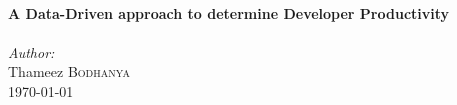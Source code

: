 \documentclass[12pt]{article}
\begin{document}
\begin{titlepage}
    \HRule \\[0.4cm]
    { \huge \bfseries A Data-Driven approach to determine Developer Productivity}\\[0.2cm] %
    \HRule \\[1cm]




    \Large \emph{Author:}\\
    Thameez \textsc{Bodhanya}\\[3cm] %


    {\large \today}\\[2cm] %

    \vfill %

\end{titlepage}

\setcounter{page}{2}
\tableofcontents
\newpage











\end{document}
